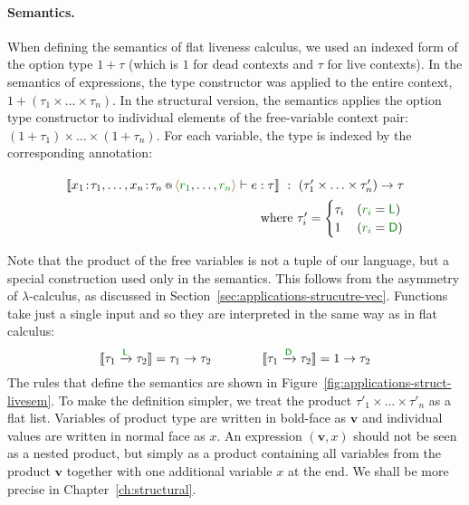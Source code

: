 \paragraph{Semantics.}
When defining the semantics of flat liveness calculus, we used an indexed form of the option type
$1 + \tau$ (which is $1$ for dead contexts and $\tau$ for live contexts). In the semantics of
expressions, the type constructor was applied to the entire context, \ie~$1+(\tau_1 \times \ldots \times \tau_n)$.
In the structural version, the semantics applies the option type constructor to individual elements
of the free-variable context pair: $(1+\tau_1) \times \ldots \times (1+ \tau_n)$. For each variable,
the type is indexed by the corresponding annotation:
%
\begin{equation*}
\begin{array}{r}
\\[-0.5em]
\sem{\coctx{x_1\!:\!\tau_1, \ldots, x_n\!:\!\tau_n}{ \alift{\cclrd{r_1}, \ldots, \cclrd{r_n}} } \vdash e : \tau}
  ~:~ (\tau'_1 \times \ldots \times \tau'_n) \rightarrow \tau\\[0.5em]
\textnormal{where}~\tau'_i = \begin{cases}
\tau_i & (\cclrd{r_i} = \cclrd{\cclrd{\ident{L}}})\\
1      & (\cclrd{r_i} = \cclrd{\cclrd{\ident{D}}})
\end{cases}
\end{array}
\end{equation*}
\vspace{0.5em}

\noindent
Note that the product of the free variables is not a tuple of our language, but a special
construction used only in the semantics. This follows from the
asymmetry of $\lambda$-calculus, as discussed in Section~\ref{sec:applications-strucutre-vec}. Functions
take just a single input and so they are interpreted in the same way as in flat calculus:
%
\begin{equation*}
\sem{\tau_1 \xrightarrow{\aclrd{\cclrd{\ident{L}}}} \tau_2} = \tau_1 \rightarrow \tau_2 \qquad\qquad
\sem{\tau_1 \xrightarrow{\aclrd{\cclrd{\ident{D}}}} \tau_2} = 1 \rightarrow \tau_2
\end{equation*}
%
The rules that define the semantics are shown in Figure~\ref{fig:applications-struct-livesem}.
To make the definition simpler, we treat the product $\tau'_1 \times \ldots \times \tau'_n$ as a
flat list. Variables of product type are written in bold-face as $\mathbf{v}$ and individual values 
are written in normal face as $x$. An expression $(\mathbf{v}, x)$ should not be seen as a
nested product, but simply as a product containing all variables from the product $\mathbf{v}$
together with one additional variable $x$ at the end. We shall be more precise in
Chapter~\ref{ch:structural}.

